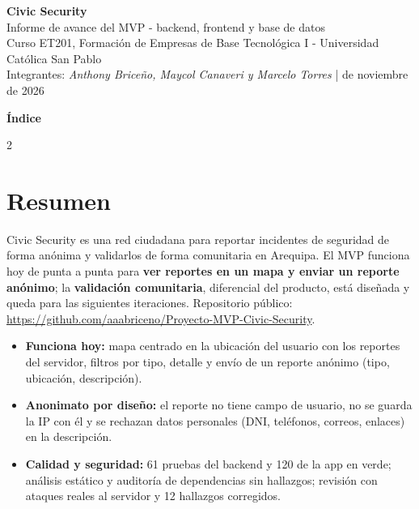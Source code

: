 \documentclass[10pt,a4paper]{article}
\begin{document}
\begin{center}
{\LARGE\bfseries Civic Security}\\[2pt]
{\large Informe de avance del MVP - backend, frontend y base de datos}\\[3pt]
{\small Curso ET201, Formación de Empresas de Base Tecnológica I - Universidad Católica San Pablo\\
Integrantes: \textit{Anthony Briceño, Maycol Canaveri y Marcelo Torres} \quad| de noviembre de 2026}
\end{center}
\vspace{-0.3em}

{\small\textbf{Índice}}\vspace{-0.4em}
\begin{multicols}{2}
\makeatletter{}\makeatother
\end{multicols}
\vspace{-0.5em}

\section{Resumen}
Civic Security es una red ciudadana para reportar incidentes de seguridad de forma anónima y validarlos de forma comunitaria en Arequipa. El MVP funciona hoy de punta a punta para \textbf{ver reportes en un mapa y enviar un reporte anónimo}; la \textbf{validación comunitaria}, diferencial del producto, está diseñada y queda para las siguientes iteraciones. Repositorio público: \url{https://github.com/aaabriceno/Proyecto-MVP-Civic-Security}.

\begin{itemize}
  \item \textbf{Funciona hoy:} mapa centrado en la ubicación del usuario con los reportes del servidor, filtros por tipo, detalle y envío de un reporte anónimo (tipo, ubicación, descripción).
  \item \textbf{Anonimato por diseño:} el reporte no tiene campo de usuario, no se guarda la IP con él y se rechazan datos personales (DNI, teléfonos, correos, enlaces) en la descripción.
  \item \textbf{Calidad y seguridad:} 61 pruebas del backend y 120 de la app en verde; análisis estático y auditoría de dependencias sin hallazgos; revisión con ataques reales al servidor y 12 hallazgos corregidos.
\end{itemize}

\end{document}

